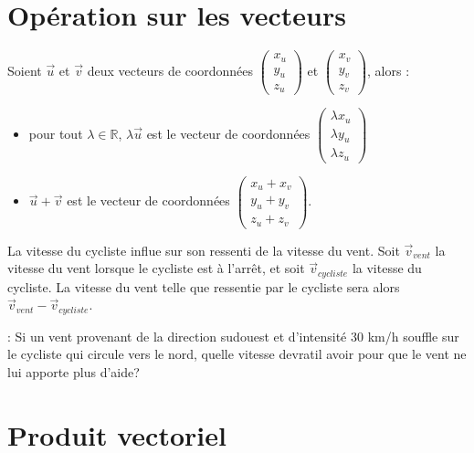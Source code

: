 \documentclass[letterpaper,10pt,english]{jupyterBook}
\begin{document}
\section{Opération sur les vecteurs}
\label{\detokenize{Part1/Cours:operation-sur-les-vecteurs}}
\sphinxAtStartPar
Soient \(\vec{u}\) et \(\vec{v}\) deux vecteurs de coordonnées \(\begin{pmatrix} x_u \\ y_u \\ z_u \end{pmatrix}\) et \(\begin{pmatrix} x_v \\ y_v \\ z_v \end{pmatrix}\), alors :
\begin{itemize}
\item {} 
\sphinxAtStartPar
pour tout \(\lambda \in \mathbb{R}\), \(\lambda\vec{u}\) est le vecteur de coordonnées \(\begin{pmatrix} \lambda x_u \\ \lambda y_u \\ \lambda z_u\end{pmatrix}\)

\item {} 
\sphinxAtStartPar
\(\vec{u}+\vec{v}\) est le vecteur de coordonnées \(\begin{pmatrix} x_u+x_v\\y_u+y_v\\z_u+z_v \end{pmatrix}\).

\end{itemize}

\sphinxAtStartPar
{} La vitesse du cycliste influe sur son ressenti de la vitesse du vent. Soit \(\vec{v}_{vent}\) la vitesse du vent lorsque le cycliste est à l’arrêt, et soit \(\vec{v}_{cycliste}\) la vitesse du cycliste. La vitesse du vent telle que ressentie par le cycliste sera alors \(\vec{v}_{vent}-\vec{v}_{cycliste}\).

\sphinxAtStartPar
{}: Si un vent provenant de la direction sud\sphinxhyphen{}ouest et d’intensité 30 km/h souffle sur le cycliste qui circule vers le nord, quelle vitesse devra\sphinxhyphen{}t\sphinxhyphen{}il avoir pour que le vent ne lui apporte plus d’aide?


\section{Produit vectoriel}
\label{\detokenize{Part1/Cours:produit-vectoriel}}
\end{document}
